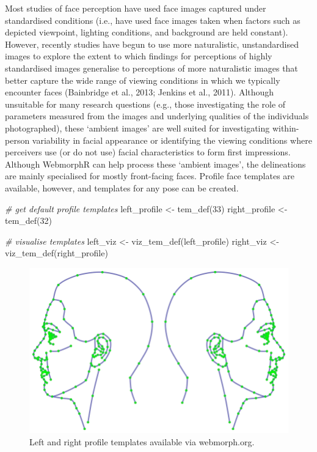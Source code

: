 \documentclass[
  doc,floatsintext]{apa6}
\newenvironment{Shaded}{\begin{snugshade}}{\end{snugshade}}
\newcommand{\CommentTok}[1]{\textcolor[rgb]{0.56,0.35,0.01}{\textit{#1}}}
\newcommand{\DecValTok}[1]{\textcolor[rgb]{0.00,0.00,0.81}{#1}}
\newcommand{\FunctionTok}[1]{\textcolor[rgb]{0.00,0.00,0.00}{#1}}
\newcommand{\NormalTok}[1]{#1}
\newcommand{\OtherTok}[1]{\textcolor[rgb]{0.56,0.35,0.01}{#1}}
\begin{document}
Most studies of face perception have used face images captured under standardised conditions (i.e., have used face images taken when factors such as depicted viewpoint, lighting conditions, and background are held constant). However, recently studies have begun to use more naturalistic, unstandardised images to explore the extent to which findings for perceptions of highly standardised images generalise to perceptions of more naturalistic images that better capture the wide range of viewing conditions in which we typically encounter faces (Bainbridge et al., 2013; Jenkins et al., 2011). Although unsuitable for many research questions (e.g., those investigating the role of parameters measured from the images and underlying qualities of the individuals photographed), these `ambient images' are well suited for investigating within-person variability in facial appearance or identifying the viewing conditions where perceivers use (or do not use) facial characteristics to form first impressions. Although WebmorphR can help process these `ambient images', the delineations are mainly specialised for mostly front-facing faces. Profile face templates are available, however, and templates for any pose can be created.

\begin{Shaded}
\begin{Highlighting}[]
\CommentTok{\# get default profile templates}
\NormalTok{left\_profile }\OtherTok{\textless{}{-}} \FunctionTok{tem\_def}\NormalTok{(}\DecValTok{33}\NormalTok{)}
\NormalTok{right\_profile }\OtherTok{\textless{}{-}} \FunctionTok{tem\_def}\NormalTok{(}\DecValTok{32}\NormalTok{)}

\CommentTok{\# visualise templates}
\NormalTok{left\_viz }\OtherTok{\textless{}{-}} \FunctionTok{viz\_tem\_def}\NormalTok{(left\_profile)}
\NormalTok{right\_viz }\OtherTok{\textless{}{-}} \FunctionTok{viz\_tem\_def}\NormalTok{(right\_profile)}
\end{Highlighting}
\end{Shaded}

\begin{figure}
\includegraphics[width=1\linewidth]{index_files/figure-latex/unnamed-chunk-24-1} \caption{Left and right profile templates available via webmorph.org.}\label{fig:unnamed-chunk-24}
\end{figure}
\end{document}
